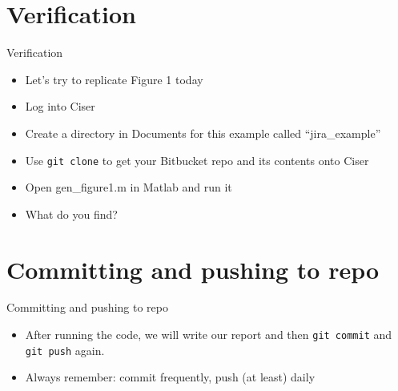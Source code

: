 \documentclass[xcolor={dvipsnames}]{beamer}
\theoremstyle{definition}
\begin{document}
\section{Verification}
\begin{frame}{Verification}
\begin{itemize}
    \item Let's try to replicate Figure 1 today
    \item Log into Ciser
    \item Create a directory in Documents for this example called ``jira\_example''
    \item Use \texttt{git clone} to get your Bitbucket repo and its contents onto Ciser
    \item Open gen\_figure1.m in Matlab and run it
    \item What do you find?
\end{itemize}
\end{frame}

\section{Committing and pushing to repo}
\begin{frame}{Committing and pushing to repo}
\begin{itemize}
    \item After running the code, we will write our report and then \texttt{git commit} and \texttt{git push} again.
    \item Always remember: commit frequently, push (at least) daily
\end{itemize}
\end{frame}
\end{document}
